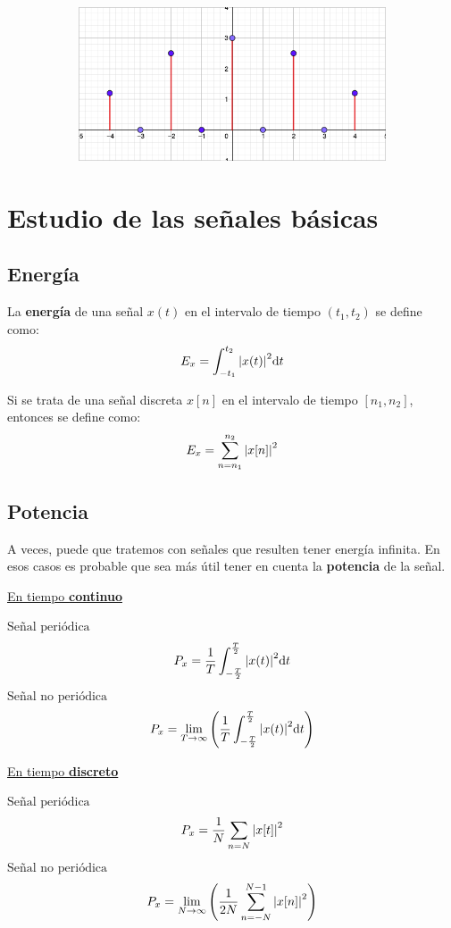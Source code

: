 \documentclass[a4paper]{book}
\begin{document}
\begin{figure}[!ht]
	\begin{subfigure}[b]{0.7\textwidth}
		\includegraphics[width=\textwidth]{./Imágenes/aam.png}
	\end{subfigure}
	\label{fig:cambio_de_escala_discreto}
\end{figure}


\newpage
\section{Estudio de las señales básicas}
\subsection{Energía}

La \textbf{energía} de una señal $x(t)$ en el intervalo de tiempo $\left( t_1, t_2 \right)$ se define como: \[E_x=\int_{-t_1}^{t_2}{\abs{x(t)}^2\dd t}\]

Si se trata de una señal discreta $x[n]$ en el intervalo de tiempo $\left[ n_1, n_2 \right]$, entonces se define como: \[E_x=\sum^{n_2}_{n=n_1}{\abs{x[n]}^2}\]

\subsection{Potencia}
A veces, puede que tratemos con señales que resulten tener energía infinita. En esos casos es probable que sea más útil tener en cuenta la \textbf{potencia} de la señal.
\vspace{10 pt}

{\centering

\underline{En tiempo \textbf{continuo}}
\begin{multicols}{2}
$\boxed{\text{Señal periódica}}$
\[P_x=\frac{1}{T}\int_{-\frac{T}{2}}^{\frac{T}{2}}{\abs{x(t)}^2\dd t}\]
$\boxed{\text{Señal no periódica}}$
\[P_x=\lim_{T \to \infty}{\left( \frac{1}{T}\int^{\frac{T}{2}}_{-\frac{T}{2}}{\abs{x(t)}^2\dd t} \right)}\]
\end{multicols}

\underline{En tiempo \textbf{discreto}}
\begin{multicols}{2}
$\boxed{\text{Señal periódica}}$
\[P_x=\frac{1}{N}\sum_{n=N}{\abs{x[t]}^2}\]
$\boxed{\text{Señal no periódica}}$
\[P_x=\lim_{N \to \infty}{\left( \frac{1}{2N}\sum^{N-1}_{n=-N}{\abs{x[n]}^2} \right) }\]
\end{multicols}}
\end{document}
